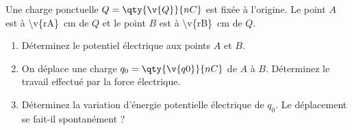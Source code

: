 Une charge ponctuelle $Q = \qty{\v{Q}}{nC}$ est fixée à l'origine. Le point $A$ est à \qty{\v{rA}}{cm} de $Q$ et le point $B$ est à \qty{\v{rB}}{cm} de $Q$.

\begin{enumerate}[label=\alph*)]
    \item Déterminez le potentiel électrique aux points $A$ et $B$.
    \item On déplace une charge $q_0 = \qty{\v{q0}}{nC}$ de $A$ à $B$. Déterminez le travail effectué par la force électrique.
    \item Déterminez la variation d'énergie potentielle électrique de $q_0$. Le déplacement se fait-il spontanément ?
\end{enumerate}
